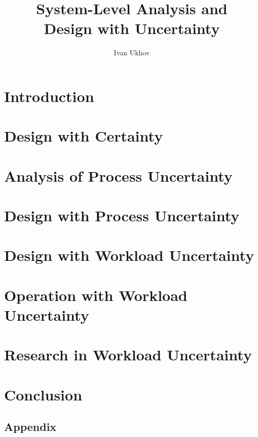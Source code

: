 \documentclass{thesis}
\title{
  System-Level Analysis and\\[0.3em]
  Design with Uncertainty
}
\author{Ivan Ukhov}
\begin{document}
\nocite{ukhov2012, ukhov2014a, ukhov2014b, ukhov2015, ukhov2017a, ukhov2017b}

\chapter{Introduction}
\newcommand{\inputsection}{}


\chapter{Design with Certainty}
\renewcommand{\inputsection}[1]{}


\chapter{Analysis of Process Uncertainty}
\renewcommand{\inputsection}[1]{}


\chapter{Design with Process Uncertainty}
\renewcommand{\inputsection}[1]{}


\chapter{Design with Workload Uncertainty}
\renewcommand{\inputsection}[1]{}


\chapter{Operation with Workload Uncertainty}
\renewcommand{\inputsection}[1]{}


\chapter{Research in Workload Uncertainty}
\renewcommand{\inputsection}[1]{}


\chapter{Conclusion}


\begin{appendices}
\chapter{Appendix}
\renewcommand{\inputsection}[1]{}

\end{appendices}

\printbibliography
\end{document}
